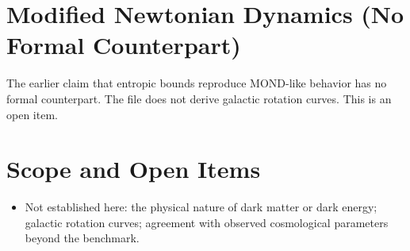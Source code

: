 \documentclass[11pt, a4paper]{article}
\begin{document}
\section{Modified Newtonian Dynamics (No Formal Counterpart)}
The earlier claim that entropic bounds reproduce MOND-like behavior has no formal counterpart. The file does not derive galactic rotation curves. This is an open item.

\section{Scope and Open Items}
\begin{itemize}
  \item Not established here: the physical nature of dark matter or dark energy; galactic rotation curves; agreement with observed cosmological parameters beyond the benchmark.
\end{itemize}
\end{document}
